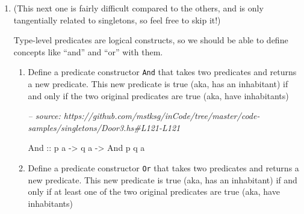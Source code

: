 \documentclass[]{article}
\newenvironment{Shaded}{}{}
\newcommand{\CommentTok}[1]{\textcolor[rgb]{0.38,0.63,0.69}{\textit{#1}}}
\newcommand{\DataTypeTok}[1]{\textcolor[rgb]{0.56,0.13,0.00}{#1}}
\newcommand{\FunctionTok}[1]{\textcolor[rgb]{0.02,0.16,0.49}{#1}}
\newcommand{\NormalTok}[1]{#1}
\newcommand{\OtherTok}[1]{\textcolor[rgb]{0.00,0.44,0.13}{#1}}
\renewcommand{\href}[2]{#2\footnote{\url{#1}}}
\begin{document}
\begin{enumerate}
  While not required, I recommend using \texttt{isKnockable} and writing your
  implementation in terms of it! Use \texttt{sing} to give \texttt{isKnockable}
  the singleton it needs.

  Solution available
  \href{https://github.com/mstksg/inCode/tree/master/code-samples/singletons/Door3.hs\#L110-L117}{here}!

  \emph{Hint:} You might find \texttt{absurd} (from \emph{Data.Void}) helpful:

\begin{Shaded}
\begin{Highlighting}[]
\OtherTok{absurd ::}\NormalTok{ forall a}\FunctionTok{.} \DataTypeTok{Void} \OtherTok{->}\NormalTok{ a}
\end{Highlighting}
\end{Shaded}

  If you have a \texttt{Void}, you can make a value of any type!\footnote{It's
    the good ol'
    \href{https://en.wikipedia.org/wiki/Principle_of_explosion}{Principle of
    Explosion}}
\item
  (This next one is fairly difficult compared to the others, and is only
  tangentially related to singletons, so feel free to skip it!)

  Type-level predicates are logical constructs, so we should be able to define
  concepts like ``and'' and ``or'' with them.

  \begin{enumerate}
  \def\labelenumii{\alph{enumii}.}
  \item
    Define a predicate constructor \texttt{And} that takes two predicates and
    returns a new predicate. This new predicate is true (aka, has an inhabitant)
    if and only if the two original predicates are true (aka, have inhabitants)

\begin{Shaded}
\begin{Highlighting}[]
\CommentTok{-- source: https://github.com/mstksg/inCode/tree/master/code-samples/singletons/Door3.hs#L121-L121}

    \DataTypeTok{And}\OtherTok{ ::}\NormalTok{ p a }\OtherTok{->}\NormalTok{ q a }\OtherTok{->} \DataTypeTok{And}\NormalTok{ p q a}
\end{Highlighting}
\end{Shaded}
  \item
    Define a predicate constructor \texttt{Or} that takes two predicates and
    returns a new predicate. This new predicate is true (aka, has an inhabitant)
    if and only if at least one of the two original predicates are true (aka,
    have inhabitants)


\end{enumerate}
\end{enumerate}
\end{document}

